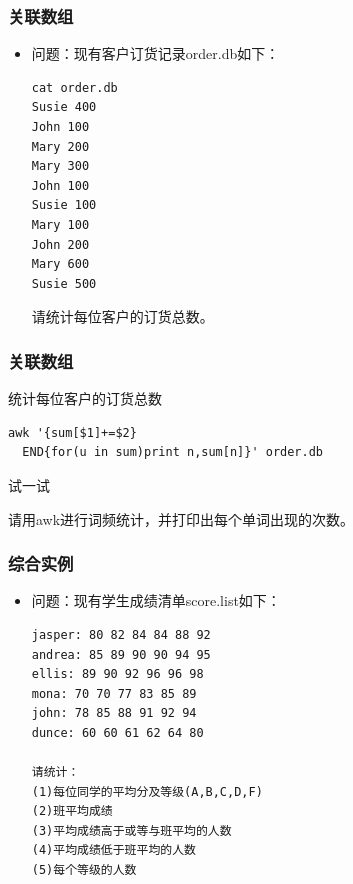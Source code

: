 \documentclass[xcolor=svgnames,presentation]{beamer}
\begin{document}
\begin{frame}[fragile]
\frametitle{关联数组}
\label{sec-2-2-28}
\begin{itemize}

\item 问题：现有客户订货记录order.db如下：\\
\label{sec-2-2-28-1}%
\begin{verbatim}
cat order.db
Susie 400
John 100
Mary 200
Mary 300
John 100
Susie 100
Mary 100
John 200
Mary 600
Susie 500
\end{verbatim}
请统计每位客户的订货总数。
\end{itemize} %
\end{frame}
\begin{frame}[fragile]
\frametitle{关联数组}
\label{sec-2-2-29}
\begin{exampleblock}{统计每位客户的订货总数}
\label{sec-2-2-29-1}


\begin{verbatim}
awk '{sum[$1]+=$2}
  END{for(u in sum)print n,sum[n]}' order.db
\end{verbatim}
\end{exampleblock}
\begin{block}{试一试}
\label{sec-2-2-29-2}

请用awk进行词频统计，并打印出每个单词出现的次数。
\end{block}
\end{frame}
\begin{frame}[fragile]
\frametitle{综合实例}
\label{sec-2-2-30}
\begin{itemize}

\item 问题：现有学生成绩清单score.list如下：\\
\label{sec-2-2-30-1}%
\begin{verbatim}
jasper: 80 82 84 84 88 92
andrea: 85 89 90 90 94 95
ellis: 89 90 92 96 96 98
mona: 70 70 77 83 85 89
john: 78 85 88 91 92 94
dunce: 60 60 61 62 64 80

请统计：
(1)每位同学的平均分及等级(A,B,C,D,F)
(2)班平均成绩
(3)平均成绩高于或等与班平均的人数
(4)平均成绩低于班平均的人数
(5)每个等级的人数
\end{verbatim}
\end{itemize} %
\end{frame}
\end{document}
